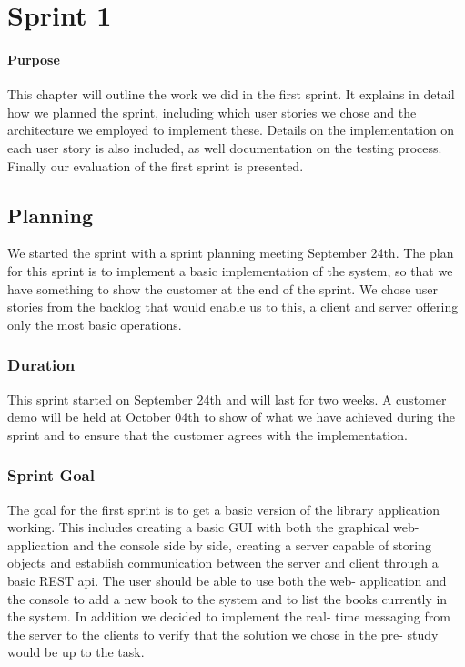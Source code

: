 \chapter{Sprint 1}

\minitoc

\subsubsection{Purpose}

This chapter will outline the work we did in the first sprint. It explains in detail how we planned the sprint, including which user stories we chose and the architecture we employed to implement these. Details on the implementation on each user story is also included, as well documentation on the testing process. Finally our evaluation of the first sprint is presented. 

\clearpage

\section{Planning}
We started the sprint with a sprint planning meeting September 24th. The plan for this sprint is to implement a basic implementation of the system, so that we have something to show the customer at the end of the sprint. We chose user stories from the backlog that would enable us to this, a client and server offering only the most basic operations. 

\subsection{Duration}
This sprint started on September 24th and will last for two weeks. A customer demo will be held at October 04th to show of what we have achieved during the sprint and to ensure that the customer agrees with the implementation.

\subsection{Sprint Goal}
The goal for the first sprint is to get a basic version of the library application working. This includes creating a basic GUI with both the graphical web- application and the console side by side, creating a server capable of storing objects and establish communication between the server and client through a basic REST api. The user should be able to use both the web- application and the console to add a new book to the system and to list the books currently in the system. In addition we decided to implement the real- time messaging from the server to the clients to verify that the solution we chose in the pre- study would be up to the task.

